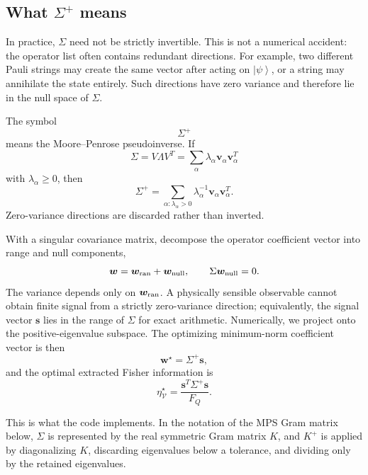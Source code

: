 \documentclass[11pt]{article}
\newcommand{\ket}[1]{\left|#1\right\rangle}
\newcommand{\V}{\mathcal V}
\newcommand{\FQ}{F_Q}
\begin{document}
\subsection{What \texorpdfstring{$\Sigma^+$}{Sigma+} means}

In practice, $\Sigma$ need not be strictly invertible.  This is not a
numerical accident: the operator list often contains redundant
directions.  For example, two different Pauli strings may create the
same vector after acting on $\ket{\psi}$, or a string may annihilate the
state entirely.  Such directions have zero variance and therefore lie
in the null space of $\Sigma$.

The symbol
\[
  \Sigma^+
\]
means the Moore--Penrose pseudoinverse.  If
\begin{equation}
  \Sigma
  =
  V\Lambda V^T
  =
  \sum_{\alpha}
  \lambda_\alpha
  \bm v_\alpha\bm v_\alpha^T
\end{equation}
with $\lambda_\alpha\ge0$, then
\begin{equation}
  \boxed{
  \Sigma^+
  =
  \sum_{\alpha:\lambda_\alpha>0}
  \lambda_\alpha^{-1}
  \bm v_\alpha\bm v_\alpha^T.
  }
  \label{eq:pseudoinverse}
\end{equation}
Zero-variance directions are discarded rather than inverted.

With a singular covariance matrix, decompose the operator coefficient
vector into range and null components,
\[
  \bm w=\bm w_{\rm ran}+\bm w_{\rm null},
  \qquad
  \Sigma \bm w_{\rm null}=0.
\]
The variance depends only on $\bm w_{\rm ran}$.  A physically sensible
observable cannot obtain finite signal from a strictly zero-variance
direction; equivalently, the signal vector $\bm s$ lies in the range of
$\Sigma$ for exact arithmetic.  Numerically, we project onto the
positive-eigenvalue subspace.  The optimizing minimum-norm coefficient
vector is then
\begin{equation}
  \bm w^\star
  =
  \Sigma^+\bm s,
\end{equation}
and the optimal extracted Fisher information is
\begin{equation}
  \boxed{
  \eta^\star_{\V}
  =
  \frac{\bm s^T\Sigma^+\bm s}{\FQ}.
  }
\end{equation}

This is what the code implements.  In the notation of the MPS Gram
matrix below, $\Sigma$ is represented by the real symmetric Gram matrix
$K$, and $K^+$ is applied by diagonalizing $K$, discarding eigenvalues
below a tolerance, and dividing only by the retained eigenvalues.
\end{document}
